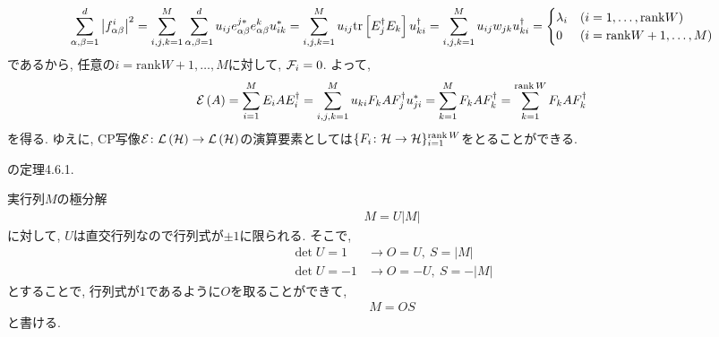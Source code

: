\begin{ex}
    \begin{align*}
        \sum_{\alpha,\beta=1}^d
        \left| f_{\alpha \beta}^{i} \right|^2
        =
        \sum_{i,j,k=1}^M
        \sum_{\alpha, \beta = 1}^d
        u_{i j} e_{\alpha \beta}^{j*} e_{\alpha \beta}^k u_{ik}^*
        =
        \sum_{i,j,k=1}^M
        u_{ij} \mathrm{tr}\left[ E_j^\dagger E_k\right] u^\dagger_{ki}
        =
        \sum_{i,j,k=1}^M u_{ij} w_{jk} u^\dagger_{ki}
        =
        \begin{cases}
            \lambda_i & ( i = 1, \dots, \mathrm{rank} W)      \\
            0         & ( i = \mathrm{rank} W + 1, \dots , M)
        \end{cases}
    \end{align*}
    であるから, 任意の$i = \mathrm{rank} W + 1, \dots , M $に対して, $\mathcal{F}_i = 0$.
    よって,
    \begin{align*}
        \mathcal{E} \left( A \right)
        =
        \sum_{i=1}^M
        E_i A E_i^{\dagger}
        =
        \sum_{i,j,k=1}^M
        u_{ki}F_k A F_j^{\dagger} u_{ji}^*
        =
        \sum_{k=1}^M
        F_k A F_k^{\dagger}
        =
        \sum_{k=1}^{\operatorname{rank} W}
        F_k A F_k^\dagger
    \end{align*}
    を得る.
    ゆえに, CP写像$\mathcal{E} \colon \mathcal{L}\left({\mathcal{H}}\right) \to \mathcal{L}\left({\mathcal{H}}\right)$の演算要素としては$\{F_i \colon \mathcal{H} \to \mathcal{H} \}_{i=1}^{\operatorname{rank} W}$をとることができる.
\end{ex}

\begin{ex}
    \label{ex8.11}
    \cite{Ishizaka2012}の定理4.6.1.
\end{ex}

\begin{ex}
    \label{ex8.12}
    実行列$M$の極分解
    \begin{align*}
        M = U |M|
    \end{align*}
    に対して, $U$は直交行列なので行列式が$\pm1$に限られる. そこで,
    \begin{align*}
        \det U = 1  & \rightarrow O = U, \ S = |M|   \\
        \det U = -1 & \rightarrow O = -U, \ S = -|M|
    \end{align*}
    とすることで, 行列式が1であるように$O$を取ることができて,
    \begin{align*}
        M = OS
    \end{align*}
    と書ける.
\end{ex}

